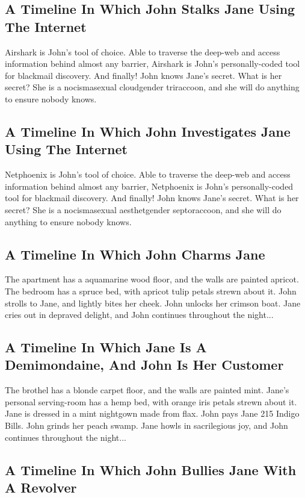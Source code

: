 \documentclass{article}
\begin{document}
\subsection{A Timeline In Which John Stalks Jane Using The Internet}


Airshark is John's tool of choice. Able to traverse the deep{-}web and access information behind almost any barrier, Airshark is John's personally{-}coded tool for blackmail discovery.
And finally!
John knows Jane's secret. What is her secret? She is a nocismasexual cloudgender triraccoon, and she will do anything to ensure nobody knows.
\subsection{A Timeline In Which John Investigates Jane Using The Internet}


Netphoenix is John's tool of choice. Able to traverse the deep{-}web and access information behind almost any barrier, Netphoenix is John's personally{-}coded tool for blackmail discovery.
And finally!
John knows Jane's secret. What is her secret? She is a nocismasexual aesthetgender septoraccoon, and she will do anything to ensure nobody knows.
\subsection{A Timeline In Which John Charms Jane}


The apartment has a aquamarine wood floor, and the walls are painted apricot.
The bedroom has a spruce bed, with apricot tulip petals strewn about it.
John strolls to Jane, and lightly bites her cheek.
John unlocks her crimson boat.
Jane cries out in depraved delight, and John continues throughout the night...
\subsection{A Timeline In Which Jane Is A Demimondaine, And John Is Her Customer}


The brothel has a blonde carpet floor, and the walls are painted mint.
Jane's personal serving{-}room has a hemp bed, with orange iris petals strewn about it.
Jane is dressed in a mint nightgown made from flax.
John pays Jane 215 Indigo Bills.
John grinds her peach swamp.
Jane howls in sacrilegious joy, and John continues throughout the night...
\subsection{A Timeline In Which John Bullies Jane With A Revolver}
\end{document}
